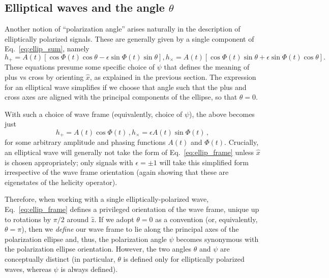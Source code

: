 \documentclass[aps,prd,twocolumn,superscriptaddress,preprintnumbers,floatfix,nofootinbib]{revtex4-2}
\newcommand{\beq}{\begin{equation}}
\newcommand{\eeq}{\end{equation}}
\begin{document}
\subsection{Elliptical waves and the angle $\theta$}
\label{sec:ellip}

Another notion of ``polarization angle'' arises naturally in the description of elliptically polarized signals.
These are generally given by a single component of Eq.~\eqref{eq:ellip_sum}, namely
\begin{subequations} \label{eq:ellip}
\begin{equation} \label{eq:ellip_p}
h_+ = A(t) \left[\cos \Phi(t) \cos \theta - \epsilon \sin \Phi(t) \sin\theta \right] ,
\end{equation}
\begin{equation} \label{eq:ellip_c}
h_\times = A(t) \left[ \cos \Phi(t) \sin \theta + \epsilon \sin \Phi(t) \cos\theta \right] .
\end{equation}
\end{subequations}
These equations presume some specific choice of $\psi$ that defines the meaning of plus vs cross by orienting $\hat{x}$, as explained in the previous section.
The expression for an elliptical wave simplifies if we choose that angle such that the plus and cross axes are aligned with the principal components of the ellipse, so that $\theta = 0$.

With such a choice of wave frame (equivalently, choice of $\psi$), the above becomes just
\begin{subequations} \label{eq:ellip_frame}
\beq
h_+ = A(t) \cos \Phi(t) \, ,
\eeq
\beq
h_\times = \epsilon A(t) \sin \Phi(t)\, ,
\eeq
\end{subequations}
for some arbitrary amplitude and phasing functions $A(t)$ and $\Phi(t)$.
Crucially, an elliptical wave will generally not take the form of Eq.~\eqref{eq:ellip_frame} unless $\hat{x}$ is chosen appropriately; only signals with $\epsilon=\pm1$ will take  this simplified form irrespective of the wave frame orientation (again showing that these are eigenstates of the helicity operator).

Therefore, when working with a single elliptically-polarized wave, Eq.~\eqref{eq:ellip_frame} defines a privileged orientation of the wave frame, unique up to rotations by $\pi/2$ around $\hat{z}$.
If we adopt $\theta =0$ as a convention (or, equivalently, $\theta=\pi$), then we \emph{define} our wave frame to lie along the principal axes of the polarization ellipse and, thus, the polarization angle $\psi$ becomes synonymous with the polarization ellipse orientation.
However, the two angles $\theta$ and $\psi$ are conceptually distinct (in particular, $\theta$ is defined only for elliptically polarized waves, whereas $\psi$ is always defined).
\end{document}
